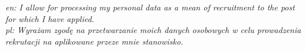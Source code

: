 \documentclass[8pt]{developercv} %
\begin{document}

\vspace{22pt}

\centering\begin{minipage}{0.8\linewidth}
  \centering\textit{
    en: I allow for processing my personal data as a mean of recruitment to the post for which I have applied.\\
    pl: Wyrażam zgodę na przetwarzanie moich danych osobowych w celu prowadzenia rekrutacji na aplikowane przeze mnie stanowisko.
  }
\end{minipage}
\end{document}
